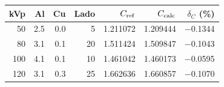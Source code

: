 \begin{tabular}{rrrrrrr}\toprule
kVp & Al & Cu & Lado & $C_{\rm ref}$ & $C_{\rm calc}$ & $\delta_C$ (\%)\\\midrule
50 & \num{2.5} & \num{0.0} & 5 & \num{1.211072} & \num{1.209444} & \num{-0.1344}\\
80 & \num{3.1} & \num{0.1} & 20 & \num{1.511424} & \num{1.509847} & \num{-0.1043}\\
100 & \num{4.1} & \num{0.1} & 10 & \num{1.461042} & \num{1.460173} & \num{-0.0595}\\
120 & \num{3.1} & \num{0.3} & 25 & \num{1.662636} & \num{1.660857} & \num{-0.1070}\\
\bottomrule\end{tabular}